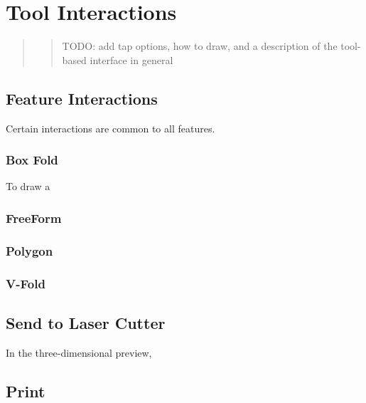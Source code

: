\section{Tool Interactions}\label{tool-interactions}

\begin{quote}
\begin{quote}
TODO: add tap options, how to draw, and a description of the tool-based
interface in general
\end{quote}
\end{quote}

\subsection{Feature Interactions}\label{feature-interactions}

Certain interactions are common to all features.

\subsubsection{Box Fold}\label{box-fold}

To draw a

\subsubsection{FreeForm}\label{freeform}

\subsubsection{Polygon}\label{polygon}

\subsubsection{V-Fold}\label{v-fold}

\subsection{Send to Laser Cutter}\label{send-to-laser-cutter}

In the three-dimensional preview,

\subsection{Print}\label{print}
